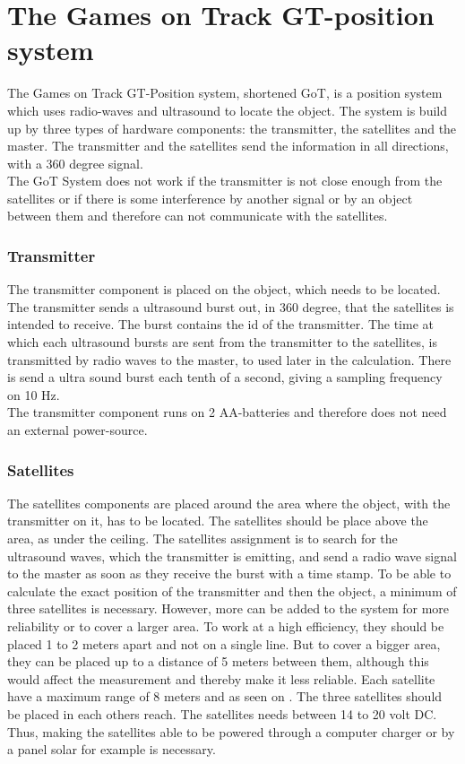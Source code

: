 \section{The Games on Track GT-position system}
\label{GoTDescription}
The Games on Track GT-Position system, shortened GoT, is a position system which uses radio-waves and ultrasound to locate the object. The system is build up by three types of hardware components: the transmitter, the satellites and the master. The transmitter and the satellites send the information in all directions, with a 360 degree signal.\\
The GoT System does not work if the transmitter is not close enough from the satellites or if there is some interference by another signal or by an object between them and therefore can not communicate with the satellites.

\subsubsection{Transmitter}
The transmitter component is placed on the object, which needs to be located. The transmitter sends a ultrasound burst out, in 360 degree, that the satellites is intended to receive. The burst contains the id of the transmitter. The time at which each ultrasound bursts are sent from the transmitter to the satellites, is transmitted by radio waves to the master, to used later in the calculation. There is send a ultra sound burst each tenth of a second, giving a sampling frequency on 10 Hz.\\ 
The transmitter component runs on 2 AA-batteries and therefore does not need an external power-source.\\

\subsubsection{Satellites}
The satellites components are placed around the area where the object, with the transmitter on it, has to be located. The satellites should be place above the area, as under the ceiling. The satellites assignment is to search for the ultrasound waves, which the transmitter is emitting, and send a radio wave signal to the master as soon as they receive the burst with a time stamp.
To be able to calculate the exact position of the transmitter and then the object, a minimum of three satellites is necessary. However, more can be added to the system for more reliability or to cover a larger area. To work at a high efficiency, they should be placed 1 to 2 meters apart and not on a single line. But to cover a bigger area, they can be placed up to a distance of 5 meters between them, although this would affect the measurement and thereby make it less reliable. Each satellite have a maximum range of 8 meters and as seen on . The three satellites should be placed in each others reach. The satellites needs between 14 to 20 volt DC. Thus, making the satellites able to be powered through a computer charger or by a panel solar for example is necessary.

